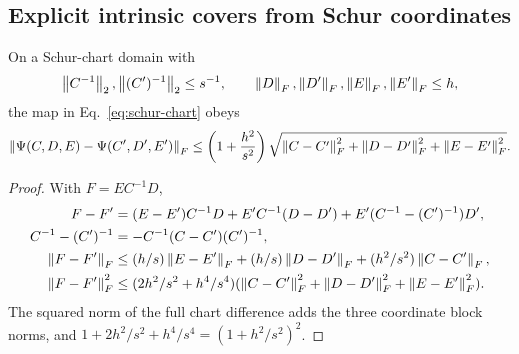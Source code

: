 \subsection{Explicit intrinsic covers from Schur coordinates}
\begin{theorem}
\label{thm:rigid-chart-Lipschitz}
On a Schur-chart domain with
\begin{equation}
\left\lVert C^{-1}\right\rVert_2,\left\lVert(C')^{-1}\right\rVert_2\leq s^{-1},\qquad
\left\lVert D\right\rVert_F,\left\lVert D'\right\rVert_F,\left\lVert E\right\rVert_F,\left\lVert E'\right\rVert_F\leq h ,
\end{equation}
the map in Eq.~\eqref{eq:schur-chart} obeys
\begin{equation}
\left\lVert\Psi(C,D,E)-\Psi(C',D',E')\right\rVert_F
\leq\left(1+\frac{h^2}{s^2}\right)
\sqrt{\left\lVert C-C'\right\rVert_F^2+\left\lVert D-D'\right\rVert_F^2+\left\lVert E-E'\right\rVert_F^2}.
\label{eq:rigid-chart-Lipschitz}
\end{equation}
\end{theorem}
\begin{proof}
With $F=EC^{-1}D$,
\begin{align}
F-F'&=(E-E')C^{-1}D+
E'C^{-1}(D-D')+E'(C^{-1}-(C')^{-1})D',\\
C^{-1}-(C')^{-1}&=-C^{-1}(C-C')(C')^{-1},\\
\left\lVert F-F'\right\rVert_F
&\leq(h/s)\left\lVert E-E'\right\rVert_F+(h/s)\left\lVert D-D'\right\rVert_F
+(h^2/s^2)\left\lVert C-C'\right\rVert_F,\\
\left\lVert F-F'\right\rVert_F^2
&\leq(2h^2/s^2+h^4/s^4)
(\left\lVert C-C'\right\rVert_F^2+\left\lVert D-D'\right\rVert_F^2+\left\lVert E-E'\right\rVert_F^2).
\end{align}
The squared norm of the full chart difference adds the three coordinate
block norms, and $1+2h^2/s^2+h^4/s^4=(1+h^2/s^2)^2$.
\end{proof}

